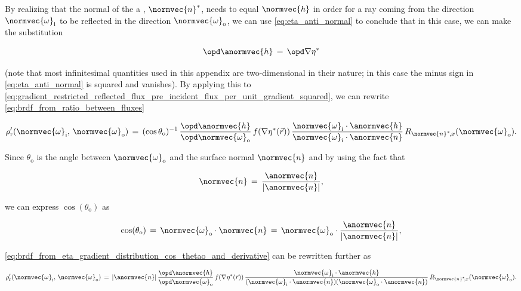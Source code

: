 By realizing that the normal of the a \microfacet, $\normvec{n}^*$, needs to equal $\normvec{h}$ in order for a ray coming from the direction $\normvec{\omega}_{\text{i}}$ to be reflected in the direction $\normvec{\omega}_{\text{o}}$, we can use \eqref{eq:eta_anti_normal} to conclude that in this case, we can make the substitution

\begin{equation}
\opd \anormvec{h} \,=\, \opd\nabla\eta^*
\end{equation}

(note that most infinitesimal quantities used in this appendix are two-dimensional in their nature; in this case the minus sign in \eqref{eq:eta_anti_normal} is squared and vanishes). By applying this to \eqref{eq:gradient_restricted_reflected_flux_pre_incident_flux_per_unit_gradient_squared}, we can rewrite  \eqref{eq:brdf_from_ratio_between_fluxes}

\begin{equation}  \label{eq:brdf_from_eta_gradient_distribution_cos_thetao_and_derivative}
\rho'_{\text{r}}(\normvec{\omega}_{\text{i}},\, \normvec{\omega}_{\text{o}}) \,=\, (\cos\theta_{\text{o}})^{-1}\, \frac{\opd\anormvec{h}}{\opd\normvec{\omega}_{\text{o}}}\,f(\nabla\eta^*(\vec{r}))\,\frac{\normvec{\omega}_{\text{i}}\cdot\anormvec{h}}{\normvec{\omega}_{\text{i}}\cdot\anormvec{n}}\,R_{\normvec{n}^*\!,x}(\normvec{\omega}_{\text{o}}).
\end{equation}

Since $\theta_{\text{o}}$ is the angle between $\normvec{\omega}_{\text{o}}$ and the surface normal $\normvec{n}$ and by using the fact that

\begin{equation} \label{eq:normal_from_anti_normal}
\normvec{n} \,=\, \frac{\anormvec{n}}{|\anormvec{n}|},
\end{equation}

we can express $\cos(\theta_{\text{o}})$ as

\begin{equation}
\cos(\theta_{\text{o}}) \,=\, \normvec{\omega}_{\text{o}}\cdot\normvec{n} \,=\, \normvec{\omega}_{\text{o}}\cdot\frac{\anormvec{n}}{|\anormvec{n}|},
\end{equation}

\eqref{eq:brdf_from_eta_gradient_distribution_cos_thetao_and_derivative} can be rewritten further as

\begin{equation}  \label{eq:brdf_from_eta_gradient_distribution_derivative}
\rho'_{\text{r}}(\normvec{\omega}_{\text{i}},\, \normvec{\omega}_{\text{o}}) \,=\, |\anormvec{n}|\,\frac{\opd\anormvec{h}}{\opd\normvec{\omega}_{\text{o}}}\,f(\nabla\eta^*(\vec{r}))\,\frac{\normvec{\omega}_{\text{i}}\cdot\anormvec{h}}{(\normvec{\omega}_{\text{i}}\cdot\anormvec{n})(\normvec{\omega}_{\text{o}}\cdot\anormvec{n})}\,R_{\normvec{n}^*\!,x}(\normvec{\omega}_{\text{o}}).
\end{equation}

